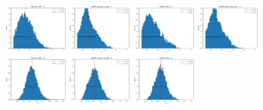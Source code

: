 \documentclass[article, shortnames]{jss}
\begin{document}
\begin{figure}[ht]
  \begin{center}
    \includegraphics[width=0.24\textwidth]{./latex_files/images/chapter4/mae2_hist_t1_rejection.pdf}
    \includegraphics[width=0.24\textwidth]{./latex_files/images/chapter4/mae2_hist_t1_romc.pdf}
    \includegraphics[width=0.24\textwidth]{./latex_files/images/chapter4/mae2_hist_t1_romc_bo.pdf}
    \includegraphics[width=0.24\textwidth]{./latex_files/images/chapter4/mae2_hist_t1_romc_nn.pdf}\\
    \includegraphics[width=0.24\textwidth]{./latex_files/images/chapter4/mae2_hist_t2_rejection.pdf}
    \includegraphics[width=0.24\textwidth]{./latex_files/images/chapter4/mae2_hist_t2_romc.pdf}
    \includegraphics[width=0.24\textwidth]{./latex_files/images/chapter4/mae2_hist_t2_romc_bo.pdf}

\end{center}
\end{figure}
\end{document}
